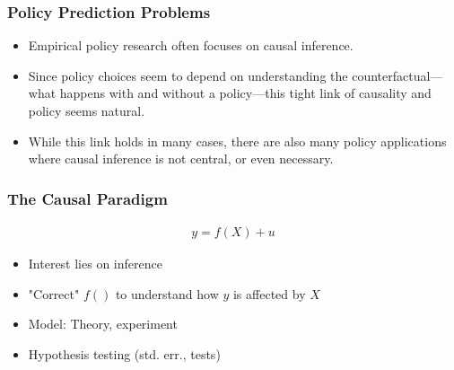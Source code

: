 \documentclass[
  shownotes,
  xcolor={svgnames},
  hyperref={colorlinks,citecolor=DarkBlue,linkcolor=andesred,urlcolor=DarkBlue}
  , aspectratio=169]{beamer}
\begin{document}
\begin{frame}
\frametitle{Policy Prediction Problems}

\begin{itemize}


\item Empirical policy research often focuses on causal inference. 
\medskip
\item Since policy choices seem to depend on understanding the counterfactual— what happens with and without a policy—this tight link of causality and policy seems natural. 
\medskip
\item  While this link holds in many cases, there are also many policy applications where causal inference is not central, or even necessary.
\end{itemize}

\end{frame}




\begin{frame}
\frametitle{The Causal Paradigm}


\begin{align}
y=f(X)+u
\end{align}
\medskip
\begin{itemize}
  \item Interest lies on inference
  \medskip
  \item "Correct" $f()$ to understand how $y$ is affected by $X$
  \medskip
  \item Model: Theory, experiment
  \medskip
  \item Hypothesis testing (std. err., tests)
\end{itemize}

\end{frame}


\end{document}
